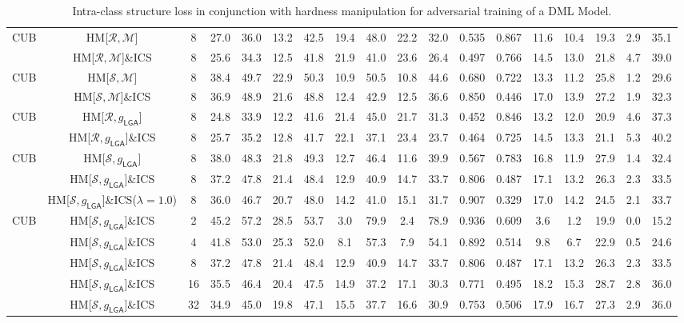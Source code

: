 \begin{table*}
{\begin{tabular}{c|cc|cccc|ccccc|ccccc|c}
\multirow{2}{*}{CUB} & HM{[}$\mathcal{R},\mathcal{M}${]} & 8 & 27.0 & 36.0 & 13.2 & 42.5 & 19.4 & 48.0 & 22.2 & 32.0 & 0.535 & 0.867 & 11.6 & 10.4 & 19.3 & 2.9 & 35.1\tabularnewline
 & HM{[}$\mathcal{R},\mathcal{M}${]}\&ICS & 8 & 25.6 & 34.3 & 12.5 & 41.8 & 21.9 & 41.0 & 23.6 & 26.4 & 0.497 & 0.766 & 14.5 & 13.0 & 21.8 & 4.7 & 39.0\tabularnewline
\hline 
\multirow{2}{*}{CUB} & HM{[}$\mathcal{S},\mathcal{M}${]} & 8 & 38.4 & 49.7 & 22.9 & 50.3 & 10.9 & 50.5 & 10.8 & 44.6 & 0.680 & 0.722 & 13.3 & 11.2 & 25.8 & 1.2 & 29.6\tabularnewline
 & HM{[}$\mathcal{S},\mathcal{M}${]}\&ICS & 8 & 36.9 & 48.9 & 21.6 & 48.8 & 12.4 & 42.9 & 12.5 & 36.6 & 0.850 & 0.446 & 17.0 & 13.9 & 27.2 & 1.9 & 32.3\tabularnewline
\hline 
\multirow{2}{*}{CUB} & HM{[}$\mathcal{R},g_{\mathsf{LGA}}${]} & 8 & 24.8 & 33.9 & 12.2 & 41.6 & 21.4 & 45.0 & 21.7 & 31.3 & 0.452 & 0.846 & 13.2 & 12.0 & 20.9 & 4.6 & 37.3\tabularnewline
 & HM{[}$\mathcal{R},g_{\mathsf{LGA}}${]}\&ICS & 8 & 25.7 & 35.2 & 12.8 & 41.7 & 22.1 & 37.1 & 23.4 & 23.7 & 0.464 & 0.725 & 14.5 & 13.3 & 21.1 & 5.3 & 40.2\tabularnewline
\hline 
\multirow{3}{*}{CUB} & HM{[}$\mathcal{S},g_{\mathsf{LGA}}${]} & 8 & 38.0 & 48.3 & 21.8 & 49.3 & 12.7 & 46.4 & 11.6 & 39.9 & 0.567 & 0.783 & 16.8 & 11.9 & 27.9 & 1.4 & 32.4\tabularnewline
 & HM{[}$\mathcal{S},g_{\mathsf{LGA}}${]}\&ICS & 8 & 37.2 & 47.8 & 21.4 & 48.4 & 12.9 & 40.9 & 14.7 & 33.7 & 0.806 & 0.487 & 17.1 & 13.2 & 26.3 & 2.3 & 33.5\tabularnewline
	& HM{[}$\mathcal{S},g_{\mathsf{LGA}}${]}\&ICS($\lambda{=}1.0$) & 8 & 36.0 & 46.7 & 20.7 & 48.0 & 14.2 & 41.0 & 15.1 & 31.7 & 0.907 & 0.329 & 17.0 & 14.2 & 24.5 & 2.1 & 33.7\tabularnewline
\hline 
\multirow{5}{*}{CUB} & HM{[}$\mathcal{S},g_{\mathsf{LGA}}${]}\&ICS & 2 & 45.2 & 57.2 & 28.5 & 53.7 & 3.0 & 79.9 & 2.4 & 78.9 & 0.936 & 0.609 & 3.6 & 1.2 & 19.9 & 0.0 & 15.2\tabularnewline
 & HM{[}$\mathcal{S},g_{\mathsf{LGA}}${]}\&ICS & 4 & 41.8 & 53.0 & 25.3 & 52.0 & 8.1 & 57.3 & 7.9 & 54.1 & 0.892 & 0.514 & 9.8 & 6.7 & 22.9 & 0.5 & 24.6\tabularnewline
 & HM{[}$\mathcal{S},g_{\mathsf{LGA}}${]}\&ICS & 8 & 37.2 & 47.8 & 21.4 & 48.4 & 12.9 & 40.9 & 14.7 & 33.7 & 0.806 & 0.487 & 17.1 & 13.2 & 26.3 & 2.3 & 33.5\tabularnewline
 & HM{[}$\mathcal{S},g_{\mathsf{LGA}}${]}\&ICS & 16 & 35.5 & 46.4 & 20.4 & 47.5 & 14.9 & 37.2 & 17.1 & 30.3 & 0.771 & 0.495 & 18.2 & 15.3 & 28.7 & 2.8 & 36.0\tabularnewline
 & HM{[}$\mathcal{S},g_{\mathsf{LGA}}${]}\&ICS & 32 & 34.9 & 45.0 & 19.8 & 47.1 & 15.5 & 37.7 & 16.6 & 30.9 & 0.753 & 0.506 & 17.9 & 16.7 & 27.3 & 2.9 & 36.0\tabularnewline

	\bottomrule

\end{tabular}

	}
	\vspace{-0.8em}
\caption{Intra-class structure loss in conjunction with hardness manipulation for adversarial training of a DML Model.}
\label{tab:ics}
\end{table*}

